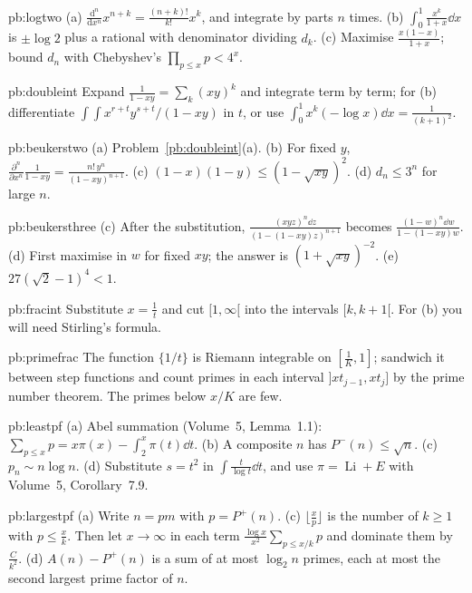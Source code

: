 \begin{hint}{pb:logtwo}
(a) $\frac{\mathrm d^n}{\mathrm dx^n}x^{n+k}=\frac{(n+k)!}{k!}x^k$, and integrate by parts $n$ times. (b) $\int_0^1\frac{x^k}{1+x}\dd x$ is $\pm\log2$ plus a rational with
denominator dividing $d_k$. (c) Maximise $\frac{x(1-x)}{1+x}$; bound $d_n$ with Chebyshev's $\prod_{p\le x}p<4^x$.
\end{hint}

\begin{hint}{pb:doubleint}
Expand $\frac1{1-xy}=\sum_k(xy)^k$ and integrate term by term; for (b) differentiate $\int\!\!\int x^{r+t}y^{s+t}/(1-xy)$ in $t$, or use
$\int_0^1x^k(-\log x)\dd x=\frac1{(k+1)^2}$.
\end{hint}

\begin{hint}{pb:beukerstwo}
(a) Problem~\ref{pb:doubleint}(a). (b) For fixed $y$, $\frac{\partial^n}{\partial x^n}\frac1{1-xy}=\frac{n!\,y^n}{(1-xy)^{n+1}}$. (c) $(1-x)(1-y)\le(1-\sqrt{xy})^2$.
(d) $d_n\le3^n$ for large $n$.
\end{hint}

\begin{hint}{pb:beukersthree}
(c) After the substitution, $\frac{(xyz)^n\dd z}{(1-(1-xy)z)^{n+1}}$ becomes $\frac{(1-w)^n\dd w}{1-(1-xy)w}$. (d) First maximise in $w$ for fixed $xy$; the
answer is $(1+\sqrt{xy})^{-2}$. (e) $27(\sqrt2-1)^4<1$.
\end{hint}

\begin{hint}{pb:fracint}
Substitute $x=\frac1t$ and cut $[1,\infty[$ into the intervals $[k,k+1[$. For (b) you will need Stirling's formula.
\end{hint}

\begin{hint}{pb:primefrac}
The function $\{1/t\}$ is Riemann integrable on $[\frac1K,1]$; sandwich it between step functions and count primes in each interval
$]xt_{j-1},xt_j]$ by the prime number theorem. The primes below $x/K$ are few.
\end{hint}

\begin{hint}{pb:leastpf}
(a) Abel summation (Volume~5, Lemma~1.1): $\sum_{p\le x}p=x\pi(x)-\int_2^x\pi(t)\dd t$. (b) A composite $n$ has $P^-(n)\le\sqrt n$. (c) $p_n\sim n\log n$. (d) Substitute $s=t^2$ in
$\int\frac t{\log t}\dd t$, and use $\pi=\operatorname{Li}+E$ with Volume~5, Corollary~7.9.
\end{hint}

\begin{hint}{pb:largestpf}
(a) Write $n=pm$ with $p=P^+(n)$. (c) $\lfloor\frac xp\rfloor$ is the number of $k\ge1$ with $p\le\frac xk$. Then let $x\to\infty$ in each term $\frac{\log x}{x^2}\sum_{p\le x/k}p$ and dominate them by $\frac C{k^2}$.
(d) $A(n)-P^+(n)$ is a sum of at most $\log_2n$ primes, each at most the second largest prime factor of $n$.
\end{hint}

